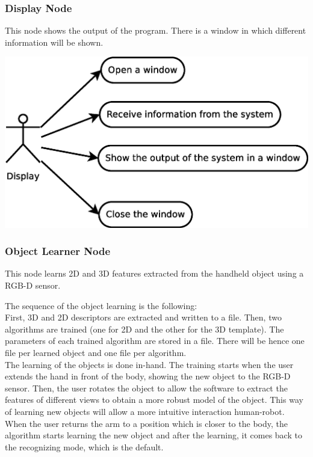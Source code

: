 \documentclass{article}
\begin{document}
\subsubsection{Display Node}
This node shows the output of the program. There is a window in which different information will be shown. 
	\begin{center}
		\includegraphics[scale=0.4]{img/diagrams/uc_display.eps}
	\end{center}
	
\subsubsection{Object Learner Node}

\hspace{0.5cm}This node learns 2D and 3D features extracted from the handheld object using a RGB-D sensor.   

The sequence of the object learning is the following:
\\
First, 3D and 2D descriptors are extracted and written to a file. Then, two algorithms are trained (one for 2D and the other for the 3D template). The parameters of each trained algorithm are stored in a file. There will be hence one file per learned object and one file per algorithm.
\\

The learning of the objects is done in-hand. The training starts when the user extends the hand in front of the body, showing the new object to the RGB-D sensor. Then, the user rotates the object to allow the software to extract the features of different views to obtain a more robust model of the object. This way of learning new objects will allow a more intuitive interaction human-robot. When the user returns the arm to a position which is closer to the body, the algorithm starts learning the new object and after the learning, it comes back to the recognizing mode, which is the default. 
\end{document}
